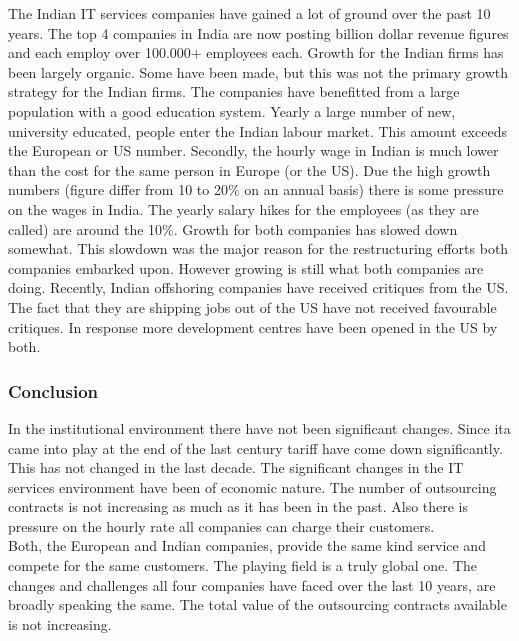 The Indian IT services companies have gained a lot of ground over the past 10 years.
The top 4 companies in India are now posting billion dollar revenue figures and each employ over 100.000+ employees each.
Growth for the Indian firms has been largely organic. 
Some \acq have been made, but this was not the primary growth strategy for the Indian firms.
The companies have benefitted from a large population with a good education system.
Yearly a large number of new, university educated, people enter the Indian labour market.
This amount exceeds the European or US number. 
Secondly, the hourly wage in Indian is much lower than  the cost for the same person in Europe (or the US).
Due the high growth numbers (figure differ from 10 to 20\% on an annual basis) there is some pressure on the wages in India.
The yearly salary hikes for the employees (as they are called) are around the 10\%.
Growth for both companies has slowed down somewhat.
This slowdown was the major reason for the restructuring efforts both companies embarked upon.
However growing is still what both companies are doing.
Recently, Indian offshoring companies have received critiques from the US\@.
The fact that they are shipping jobs out of the US have not received favourable critiques.
In response more development centres have been opened in the US by both.


\subsubsection{Conclusion}
In the institutional environment there have not been significant changes.
Since \gls{ita} came into play at the end of the last century tariff have come down significantly.
This has not changed in the last decade.
The significant changes in the IT services environment have been of economic nature.
The number of outsourcing contracts is not increasing as much as it has been in the past.
Also there is pressure on the hourly rate all companies can charge their customers.\\
Both, the European and Indian companies, provide the same kind service and compete for the same customers.
The playing field is a truly global one.
The changes and challenges all four companies have faced over the last 10 years, are broadly speaking the same.
The total value of the outsourcing contracts available is not increasing.


